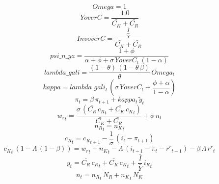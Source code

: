 \begin{dmath*}
Omega = 1
\end{dmath*}
\begin{dmath*}
YoverC = \frac{1.0}{{\bar{C_K}}+{\bar{C_R}}}
\end{dmath*}
\begin{dmath*}
InvoverC = \frac{{{\frac{\bar{I}}{\bar{Y}}}}}{{\bar{C_K}}+{\bar{C_R}}}
\end{dmath*}
\begin{dmath*}
psi\_n\_ya = \frac{1+{{\phi}}}{{{\alpha}}+{{\phi}}+{{\sigma}}\, {YoverC_{t}}\, \left(1-{{\alpha}}\right)}
\end{dmath*}
\begin{dmath*}
lambda\_gali = \frac{\left(1-{{\theta}}\right)\, \left(1-{{\theta}}\, {{\beta}}\right)}{{{\theta}}}\, {Omega_{t}}
\end{dmath*}
\begin{dmath*}
kappa = {lambda\_gali_{t}}\, \left({{\sigma}}\, {YoverC_{t}}+\frac{{{\phi}}+{{\alpha}}}{1-{{\alpha}}}\right)
\end{dmath*}
\begin{dmath}
{{\pi}_{t}}={{\beta}}\, {{\pi}_{t+1}}+{kappa_{t}}\, {{\tilde y}_{t}}
\end{dmath}
\begin{dmath}
{{w_r}_{t}}=\frac{{{\sigma}}\, \left({\bar{C_R}}\, {{c_R}_{t}}+{\bar{C_K}}\, {{c_K}_{t}}\right)}{{\bar{C_K}}+{\bar{C_R}}}+{{\phi}}\, {{n}_{t}}
\end{dmath}
\begin{dmath}
{{n_R}_{t}}={{n_K}_{t}}
\end{dmath}
\begin{dmath}
{{c_R}_{t}}={{c_R}_{t+1}}-\frac{1}{{{\sigma}}}\, \left({{i}_{t}}-{{\pi}_{t+1}}\right)
\end{dmath}
\begin{dmath}
{{c_K}_{t}}\, \left(1-{{\Lambda}}\, \left(1-{{\beta}}\right)\right)={{w_r}_{t}}+{{n_K}_{t}}-{{\Lambda}}\, \left({{i}_{t-1}}-{{\pi}_{t}}-{{r^r}_{t-1}}\right)-{{\beta}}\, {{\Lambda}}\, {{r^r}_{t}}
\end{dmath}
\begin{dmath}
{{y}_{t}}={\bar{C_R}}\, {{c_R}_{t}}+{\bar{C_K}}\, {{c_K}_{t}}+{{\frac{\bar{I}}{\bar{Y}}}}\, {{i_R}_{t}}
\end{dmath}
\begin{dmath}
{{n}_{t}}={{n_R}_{t}}\, {\bar{N_R}}+{{n_K}_{t}}\, {\bar{N_K}}
\end{dmath}
